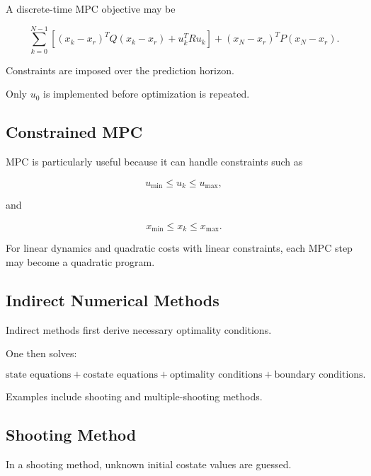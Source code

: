 A discrete-time MPC objective may be

\[
\boxed{
\sum_{k=0}^{N-1}
\left[
(x_k-x_r)^TQ(x_k-x_r)
+
u_k^TRu_k
\right]
+
(x_N-x_r)^TP(x_N-x_r).
}
\]

Constraints are imposed over the prediction horizon.

Only \(u_0\) is implemented before optimization is repeated.

\subsection{Constrained MPC}
\label{subsec:constrained-mpc}

MPC is particularly useful because it can handle constraints such as

\[
\boxed{
u_{\min}\leq u_k\leq u_{\max},
}
\]

and

\[
\boxed{
x_{\min}\leq x_k\leq x_{\max}.
}
\]

For linear dynamics and quadratic costs with linear constraints, each MPC
step may become a quadratic program.

\subsection{Indirect Numerical Methods}
\label{subsec:indirect-optimal-control-methods}

Indirect methods first derive necessary optimality conditions.

One then solves:

\[
\boxed{
\text{state equations}
+
\text{costate equations}
+
\text{optimality conditions}
+
\text{boundary conditions}.
}
\]

Examples include shooting and multiple-shooting methods.

\subsection{Shooting Method}
\label{subsec:shooting-method}

In a shooting method, unknown initial costate values are guessed.

